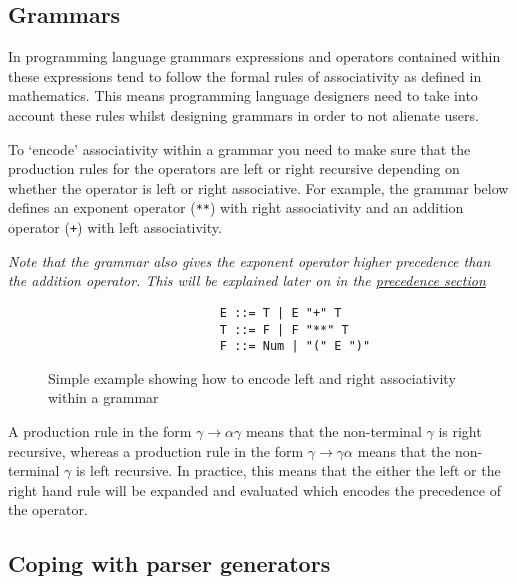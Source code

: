 \subsection{Grammars}

In programming language grammars expressions and operators contained within these expressions tend to follow the formal rules of associativity as defined in mathematics. This means programming language designers need to take into account these rules whilst designing grammars in order to not alienate users.

To `encode' associativity within a grammar you need to make sure that the production rules for the operators are left or right recursive depending on whether the operator is left or right associative. For example, the grammar below defines an exponent operator (\verb|**|) with right associativity and an addition operator (\verb|+|) with left associativity.

\textit{Note that the grammar also gives the exponent operator higher precedence than the addition operator. This will be explained later on in the \hyperref[sec:precedence]{precedence section}}

\begin{figure}[H]
    \begin{center}
        \begin{verbatim}
                        E ::= T | E "+" T
                        T ::= F | F "**" T
                        F ::= Num | "(" E ")"
        \end{verbatim}
    \end{center}
    \vspace{-1.5em}
    \caption{\label{fig:4.2}Simple example showing how to encode left and right associativity within a grammar}
\end{figure}

A production rule in the form $\gamma \rightarrow \alpha \gamma$ means that the non-terminal $\gamma$ is right recursive, whereas a production rule in the form $\gamma \rightarrow \gamma \alpha$ means that the non-terminal $\gamma$ is left recursive. In practice, this means that the either the left or the right hand rule will be expanded and evaluated which encodes the precedence of the operator.\textsuperscript{\cite{abrahamson_2021}\cite{lam_2019}}

\subsection{Coping with parser generators}

